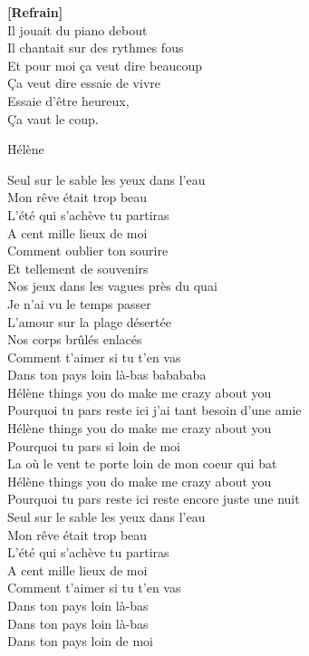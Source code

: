 \documentclass{novel}
\begin{document}
\begin{multicols}{2}
\textbf{[Refrain]}\\

Il jouait du piano debout \\
Il chantait sur des rythmes fous \\
Et pour moi ça veut dire beaucoup \\
Ça veut dire essaie de vivre \\
Essaie d'être heureux, \\
Ça vaut le coup.
\end{multicols}

\newpage
\normalsize
\h*{Hélène}

Seul sur le sable les yeux dans l'eau \\
Mon rêve était trop beau \\
L'été qui s'achève tu partiras \\
A cent mille lieux de moi \\
Comment oublier ton sourire \\
Et tellement de souvenirs \\

Nos jeux dans les vagues près du quai \\
Je n'ai vu le temps passer \\
L'amour sur la plage désertée \\
Nos corps brûlés enlacés \\
Comment t'aimer si tu t'en vas \\
Dans ton pays loin là-bas babababa \\

Hélène things you do make me crazy about you \\
Pourquoi tu pars reste ici j'ai tant besoin d'une amie \\
Hélène things you do make me crazy about you \\
Pourquoi tu pars si loin de moi \\
La où le vent te porte loin de mon coeur qui bat \\

Hélène things you do make me crazy about you \\
Pourquoi tu pars reste ici reste encore juste une nuit \\

Seul sur le sable les yeux dans l'eau \\
Mon rêve était trop beau \\
L'été qui s'achève tu partiras \\
A cent mille lieux de moi \\
Comment t'aimer si tu t'en vas \\
Dans ton pays loin là-bas \\
Dans ton pays loin là-bas \\
Dans ton pays loin de moi
\end{document}

